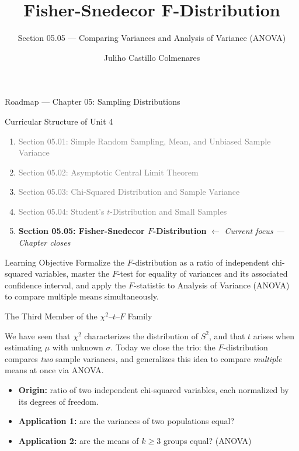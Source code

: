 \documentclass[aspectratio=169,xcolor={dvipsnames,table}]{beamer}
\title{Fisher-Snedecor F-Distribution}
\subtitle{Section 05.05 --- Comparing Variances and Analysis of Variance (ANOVA)}
\author[J. Castillo Colmenares]{Juliho Castillo Colmenares}
\institute[Tec de Monterrey]{Tecnologico de Monterrey}
\date{\vspace{-1.5cm}}
\begin{document}
\begin{frame}[plain]
	\titlepage
\end{frame}

\begin{frame}{Roadmap --- Chapter 05: Sampling Distributions}
	\vspace{-0.15cm}
	\begin{block}{Curricular Structure of Unit 4}
		\footnotesize
		\begin{enumerate}\itemsep=0.03cm
			\item \textcolor{gray}{Section 05.01: Simple Random Sampling, Mean, and Unbiased Sample Variance}
			\item \textcolor{gray}{Section 05.02: Asymptotic Central Limit Theorem}
			\item \textcolor{gray}{Section 05.03: Chi-Squared Distribution and Sample Variance}
			\item \textcolor{gray}{Section 05.04: Student's $t$-Distribution and Small Samples}
			\item \textbf{\textcolor{TecRojo}{Section 05.05: Fisher-Snedecor $F$-Distribution}} $\leftarrow$ \emph{Current focus --- Chapter closes}
		\end{enumerate}
	\end{block}
	\vspace{-0.2cm}
	\begin{alertblock}{Learning Objective}
		\scriptsize
		Formalize the $F$-distribution as a ratio of independent chi-squared variables, master the $F$-test for equality of variances and its associated confidence interval, and apply the $F$-statistic to Analysis of Variance (ANOVA) to compare multiple means simultaneously.
	\end{alertblock}
\end{frame}

\begin{frame}{The Third Member of the $\chi^2$--$t$--$F$ Family}
	\footnotesize
	\begin{motivacion}
		We have seen that $\chi^2$ characterizes the distribution of $S^2$, and that $t$ arises when estimating $\mu$ with unknown $\sigma$. Today we close the trio: the $F$-distribution compares \emph{two} sample variances, and generalizes this idea to compare \emph{multiple} means at once via ANOVA.
	\end{motivacion}
	\vspace{0.15cm}
	\pause
	\begin{itemize}\itemsep=0.1cm
		\item \textbf{Origin:} ratio of two independent chi-squared variables, each normalized by its degrees of freedom. \pause
		\item \textbf{Application 1:} are the variances of two populations equal? \pause
		\item \textbf{Application 2:} are the means of $k\ge 3$ groups equal? (ANOVA)
	\end{itemize}
\end{frame}
\end{document}
